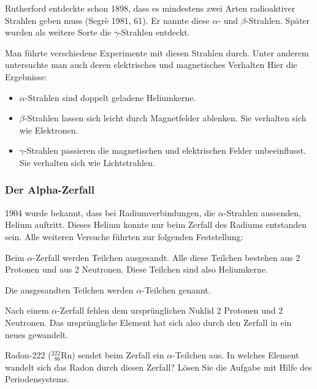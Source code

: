 \documentclass[12pt,a4paper,twoside]{article}
\newcommand{\Kern}[3]{$^{#1}_{\phantom{1}#2}\text{#3}$}
\begin{document}
Rutherford entdeckte schon 1898, dass es mindestens zwei Arten radioaktiver Strahlen geben muss (Segrè 1981, 61).
Er nannte diese $\alpha$- und $\beta$-Strahlen. Später wurden als weitere Sorte die $\gamma$-Strahlen entdeckt. 

Man führte verschiedene Experimente mit diesen Strahlen durch. 
Unter anderem untersuchte man auch deren elektrisches und magnetisches Verhalten %
Hier die Ergebnisse:
\begin{itemize}
	\item $\alpha$-Strahlen sind doppelt geladene Heliumkerne.
	\item $\beta$-Strahlen lassen sich leicht durch Magnetfelder ablenken. Sie verhalten sich wie Elektronen.
	\item $\gamma$-Strahlen passieren die magnetischen und elektrischen Felder unbeeinflusst. Sie verhalten sich wie Lichtstrahlen.
\end{itemize}



 



\subsubsection*{Der Alpha-Zerfall}

1904 wurde bekannt, dass bei Radiumverbindungen, die $\alpha$-Strahlen aussenden, 
Helium auftritt. Dieses Helium konnte nur beim Zerfall des Radiums entstanden sein. 
Alle weiteren Versuche führten zur folgenden Feststellung:

Beim $\alpha$-Zerfall werden Teilchen ausgesandt.
Alle diese Teilchen bestehen aus 2 Protonen und aus 2 Neutronen. 
Diese Teilchen sind also Heliumkerne.

Die ausgesandten Teilchen werden $\alpha$-Teilchen genannt.



Nach einem $\alpha$-Zerfall fehlen dem ursprünglichen Nuklid 2 Protonen und 2 Neutronen. 
Das ursprüngliche Element hat sich also durch den Zerfall in ein neues gewandelt.

\begin{aufgabe}
Radon-222 (\Kern{222}{86}{Rn}) sendet beim Zerfall ein $\alpha$-Teilchen aus. In welches Element wandelt sich das Radon durch diesen Zerfall?
Lösen Sie die Aufgabe mit Hilfe des Periodensystems.
\end{aufgabe}
\end{document}
